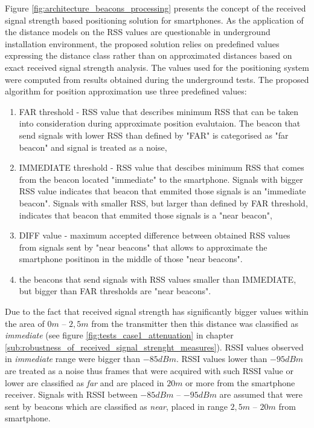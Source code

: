 \documentclass[../main.tex]{subfiles}
\begin{document}
Figure \ref{fig:architecture_beacons_processing} presents the concept of the received signal strength based positioning solution for smartphones. As the application of the distance models on the RSS values are questionable in underground installation environment, the proposed solution relies on predefined values expressing the distance class rather than on approximated distances based on exact received signal strength analysis. The values used for the positioning system were computed from results obtained during the underground tests. The proposed algorithm for position approximation use three predefined values:
\begin{enumerate}
	\item FAR threshold - RSS value that describes minimum RSS that can be taken into consideration during approximate position evalutaion. The beacon that send signals with lower RSS than defined by "FAR" is categorised as "far beacon" and signal is treated as a noise,
	\item IMMEDIATE threshold - RSS value that descibes minimum RSS that comes from the beacon located "immediate" to the smartphone. Signals with bigger RSS value indicates that beacon that emmited those signals is an "immediate beacon". Signals with smaller RSS, but larger than defined by FAR threshold, indicates that beacon that emmited those signals is a "near beacon",
	\item DIFF value - maximum accepted difference between obtained RSS values from signals sent by "near beacons" that allows to approximate the smartphone positinon in the middle of those "near beacons".
	\item the beacons that send signals with RSS values smaller than IMMEDIATE, but bigger than FAR thresholds are "near beacons".
\end{enumerate}

Due to the fact that received signal strength has significantly bigger values within the area of $0 m$ -- $2,5 m$ from the transmitter then this distance was classified as \textit{immediate} (see figure \ref{fig:tests_case1_attenuation} in chapter \ref{sub:robustness_of_received_signal_strenght_measures}). RSSI values observed in \textit{immediate} range were bigger than $-85 dBm$. RSSI values lower than $-95 dBm$ are treated as a noise thus frames that were acquired with such RSSI value or lower are classified as \textit{far} and are placed in $20 m$ or more from the smartphone receiver. Signals with RSSI between $-85 dBm$ -- $-95 dBm$ are assumed that were sent by beacons which are classified as \textit{near}, placed in range $2,5 m$ -- $20 m$ from smartphone.
\end{document}
